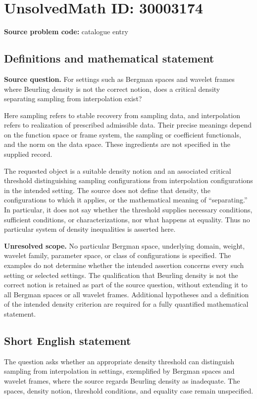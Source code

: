 \documentclass[11pt]{article}
\begin{document}
\section*{UnsolvedMath ID: 30003174}
\textbf{Source problem code:} catalogue entry
\subsection{Definitions and mathematical statement}
\textbf{Source question.} For settings such as Bergman spaces and wavelet frames where Beurling density is not the correct notion, does a critical density separating sampling from interpolation exist?

Here sampling refers to stable recovery from sampling data, and interpolation refers to realization of prescribed admissible data. Their precise meanings depend on the function space or frame system, the sampling or coefficient functionals, and the norm on the data space. These ingredients are not specified in the supplied record.

The requested object is a suitable density notion and an associated critical threshold distinguishing sampling configurations from interpolation configurations in the intended setting. The source does not define that density, the configurations to which it applies, or the mathematical meaning of ``separating.'' In particular, it does not say whether the threshold supplies necessary conditions, sufficient conditions, or characterizations, nor what happens at equality. Thus no particular system of density inequalities is asserted here.

\textbf{Unresolved scope.} No particular Bergman space, underlying domain, weight, wavelet family, parameter space, or class of configurations is specified. The examples do not determine whether the intended assertion concerns every such setting or selected settings. The qualification that Beurling density is not the correct notion is retained as part of the source question, without extending it to all Bergman spaces or all wavelet frames. Additional hypotheses and a definition of the intended density criterion are required for a fully quantified mathematical statement.
\subsection{Short English statement}
The question asks whether an appropriate density threshold can distinguish sampling from interpolation in settings, exemplified by Bergman spaces and wavelet frames, where the source regards Beurling density as inadequate. The spaces, density notion, threshold conditions, and equality case remain unspecified.
\end{document}
